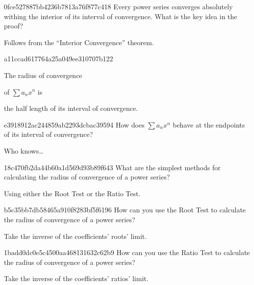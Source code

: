 \begin{note}{0fce527887bb4236b7813a76f877c418}
    Every power series converges absolutely withing the interior of its interval of convergence.
    What is the key idea in the proof?

    \begin{cloze}{1}
        Follows from the ``Interior Convergence'' theorem.
    \end{cloze}
\end{note}

\begin{note}{a11ccad617764a25a049ee310707b122}
    \begin{icloze}{2}The radius of convergence\end{icloze} of \({ \sum a_n x^{n} }\) is \begin{icloze}{1}the half length of its interval of convergence.\end{icloze}
\end{note}

\begin{note}{e3918912ac244859ab2293dcbac39594}
    How does \({ \sum a_n x^{n} }\) behave at the endpoints of its interval of convergence?

    \begin{cloze}{1}
        Who knows\ldots
    \end{cloze}
\end{note}

\begin{note}{18c470fb2da44b60a1d569d93b89f643}
    What are the simplest methods for calculating the radius of convergence of a power series?

    \begin{cloze}{1}
        Using either the Root Test or the Ratio Test.
    \end{cloze}
\end{note}

\begin{note}{b5c35bb7db58465a910f8283bf5f6196}
    How can you use the Root Test to calculate the radius of convergence of a power series?

    \begin{cloze}{1}
        Take the inverse of the coefficients' roots' limit.
    \end{cloze}
\end{note}

\begin{note}{1badd0dc0e5c4500aa468131632c62b9}
    How can you use the Ratio Test to calculate the radius of convergence of a power series?

    \begin{cloze}{1}
        Take the inverse of the coefficients' ratios' limit.
    \end{cloze}
\end{note}

